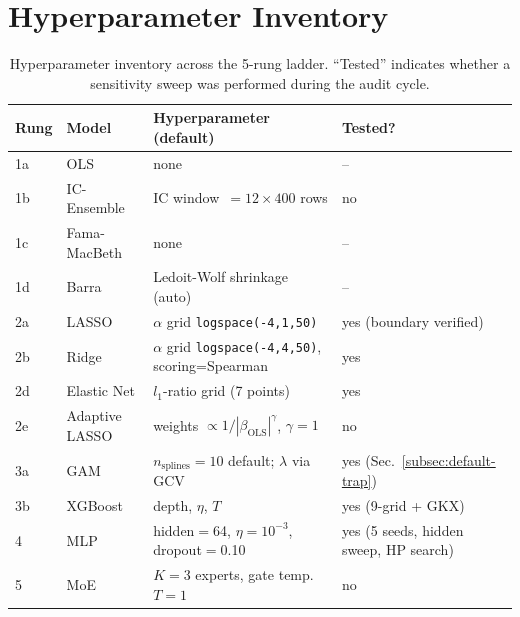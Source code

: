 \documentclass[11pt]{article}
\begin{document}
\appendix
\section{Hyperparameter Inventory}\label{app:hp}

\begin{table}[h]
\centering
\caption{Hyperparameter inventory across the 5-rung ladder. ``Tested''
indicates whether a sensitivity sweep was performed during the audit
cycle.}
\label{tab:hp-inventory}
\small
\begin{tabular}{l l l l}
\toprule
Rung & Model & Hyperparameter (default) & Tested? \\
\midrule
1a & OLS                & none & --   \\
1b & IC-Ensemble        & IC window~$=12\times 400$ rows & no   \\
1c & Fama-MacBeth       & none & --   \\
1d & Barra              & Ledoit-Wolf shrinkage (auto) & --   \\
\midrule
2a & LASSO              & $\alpha$ grid \texttt{logspace(-4,1,50)} & yes (boundary verified) \\
2b & Ridge              & $\alpha$ grid \texttt{logspace(-4,4,50)}, scoring=Spearman & yes \\
2d & Elastic Net        & $l_1$-ratio grid (7 points) & yes \\
2e & Adaptive LASSO     & weights $\propto 1/|\beta_\text{OLS}|^\gamma$, $\gamma{=}1$ & no \\
\midrule
3a & GAM                & $n_{\text{splines}}{=}10$ default; $\lambda$ via GCV & yes (Sec.~\ref{subsec:default-trap}) \\
3b & XGBoost            & depth, $\eta$, $T$ & yes (9-grid + GKX) \\
\midrule
4  & MLP                & hidden$=$64, $\eta=10^{-3}$, dropout$=$0.10 & yes (5 seeds, hidden sweep, HP search) \\
\midrule
5  & MoE                & $K{=}3$ experts, gate temp.~$T{=}1$ & no \\
\bottomrule
\end{tabular}
\end{table}
\end{document}
